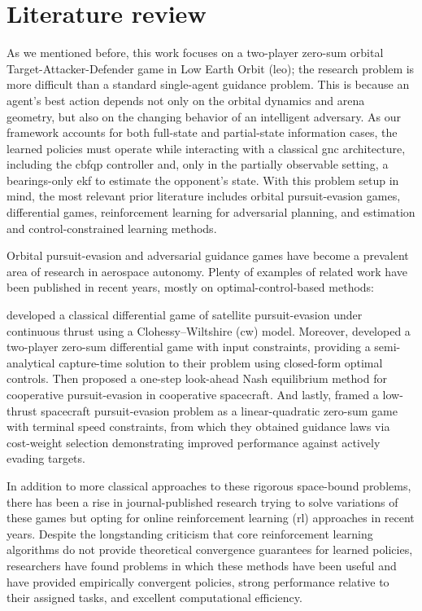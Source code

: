 \chapter{Literature review}
\label{chap:Lit_Review}

As we mentioned before, this work focuses on a two-player zero-sum orbital Target-Attacker-Defender game in Low Earth Orbit (\acs{leo}); the research problem is more difficult than a standard single-agent guidance problem. This is because an agent's best action depends not only on the orbital dynamics and arena geometry, but also on the changing behavior of an intelligent adversary. As our framework accounts for both full-state and partial-state information cases, the learned policies must operate while interacting with a classical \acs{gnc} architecture, including the \acs{cbfqp} controller and, only in the partially observable setting, a bearings-only \acs{ekf} to estimate the opponent's state. With this problem setup in mind, the most relevant prior literature includes orbital pursuit-evasion games, differential games, reinforcement learning for adversarial planning, and estimation and control-constrained learning methods.

Orbital pursuit-evasion and adversarial guidance games have become a prevalent area of research in aerospace autonomy. Plenty of examples of related work have been published in recent years, mostly on optimal-control-based methods:

\cite{gong2020continuousthrust} developed a classical differential game of satellite pursuit-evasion under continuous thrust using a Clohessy--Wiltshire (\acs{cw}) model. Moreover, \cite{selvakumar2017orbitalplane} developed a two-player zero-sum differential game with input constraints, providing a semi-analytical capture-time solution to their problem using closed-form optimal controls. Then \cite{liu2025multipletoone} proposed a one-step look-ahead Nash equilibrium method for cooperative pursuit-evasion in cooperative spacecraft. And lastly, \cite{drucker2026lowthrustgames} framed a low-thrust spacecraft pursuit-evasion problem as a linear-quadratic zero-sum game with terminal speed constraints, from which they obtained guidance laws via cost-weight selection demonstrating improved performance against actively evading targets.


In addition to more classical approaches to these rigorous space-bound problems, there has been a rise in journal-published research trying to solve variations of these games but opting for online reinforcement learning (\acs{rl}) approaches in recent years. Despite the longstanding criticism that core reinforcement learning algorithms do not provide theoretical convergence guarantees for learned policies, researchers have found problems in which these methods have been useful and have provided empirically convergent policies, strong performance relative to their assigned tasks, and excellent computational efficiency.



